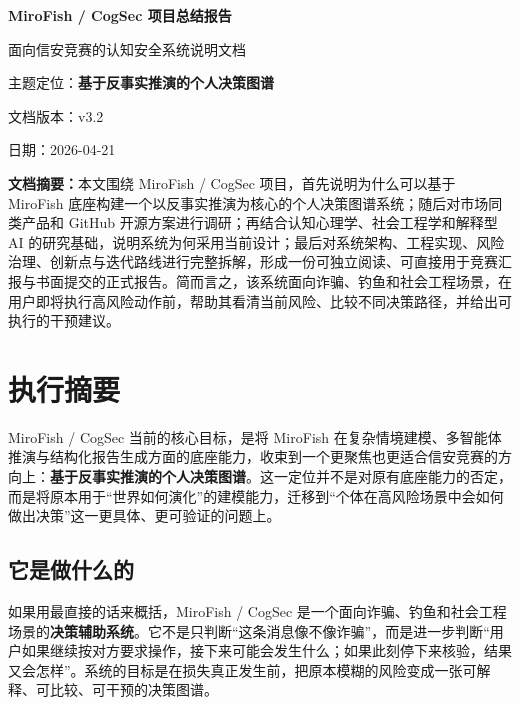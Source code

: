 \documentclass[12pt,a4paper]{ctexart}
\newcommand{\ProjectName}{MiroFish / CogSec}
\newcommand{\CorePosition}{\textbf{基于反事实推演的个人决策图谱}}
\newcommand{\ResearchDate}{2026-04-21}
\begin{document}
\begin{titlepage}
  \centering
  \vspace*{2.2cm}
  {\Huge\bfseries MiroFish / CogSec 项目总结报告\par}
  \vspace{0.6cm}
  {\Large 面向信安竞赛的认知安全系统说明文档\par}
  \vspace{0.5cm}
  {\Large 主题定位：\CorePosition{}\par}
  \vspace{1.8cm}
  {\large 文档版本：v3.2\par}
  \vspace{0.3cm}
  {\large 日期：\ResearchDate\par}
  \vfill
  \begin{minipage}{0.88\textwidth}
  \small
  \textbf{文档摘要：}本文围绕 \ProjectName{} 项目，首先说明为什么可以基于 MiroFish 底座构建一个以反事实推演为核心的个人决策图谱系统；随后对市场同类产品和 GitHub 开源方案进行调研；再结合认知心理学、社会工程学和解释型 AI 的研究基础，说明系统为何采用当前设计；最后对系统架构、工程实现、风险治理、创新点与迭代路线进行完整拆解，形成一份可独立阅读、可直接用于竞赛汇报与书面提交的正式报告。简而言之，该系统面向诈骗、钓鱼和社会工程场景，在用户即将执行高风险动作前，帮助其看清当前风险、比较不同决策路径，并给出可执行的干预建议。
  \end{minipage}
\end{titlepage}

\tableofcontents
\newpage

\section{执行摘要}

\ProjectName{} 当前的核心目标，是将 MiroFish 在复杂情境建模、多智能体推演与结构化报告生成方面的底座能力，收束到一个更聚焦也更适合信安竞赛的方向上：\CorePosition{}。这一定位并不是对原有底座能力的否定，而是将原本用于“世界如何演化”的建模能力，迁移到“个体在高风险场景中会如何做出决策”这一更具体、更可验证的问题上。

\subsection{它是做什么的}

如果用最直接的话来概括，\ProjectName{} 是一个面向诈骗、钓鱼和社会工程场景的\textbf{决策辅助系统}。它不是只判断“这条消息像不像诈骗”，而是进一步判断“用户如果继续按对方要求操作，接下来可能会发生什么；如果此刻停下来核验，结果又会怎样”。系统的目标是在损失真正发生前，把原本模糊的风险变成一张可解释、可比较、可干预的决策图谱。
\end{document}
